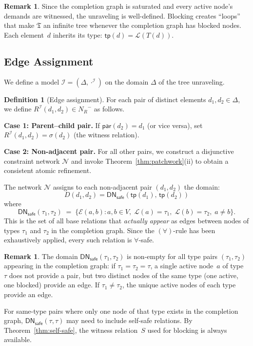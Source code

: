 \documentclass[a4paper,11pt]{article}
\theoremstyle{definition}
\newtheorem{definition}[theorem]{Definition}
\newtheorem{remark}[theorem]{Remark}
\newcommand{\NR}{\ensuremath{N_R}}
\newcommand{\interp}{\ensuremath{\mathcal{I}}}
\newcommand{\DN}{\ensuremath{\mathsf{DN}}}
\begin{document}
\begin{remark}
Since the completion graph is saturated and every active node's
demands are witnessed, the unraveling is well-defined.  Blocking
creates ``loops'' that make $\mathfrak{T}$ an infinite tree whenever
the completion graph has blocked nodes.  Each element~$d$ inherits its
type: $\mathsf{tp}(d) = \mathcal{L}(T(d))$.
\end{remark}

\subsection{Edge Assignment}

We define a model $\interp = (\Delta, \cdot^{\interp})$ on the domain
$\Delta$ of the tree unraveling.

\begin{definition}[Edge assignment]
\label{def:edge-assignment}
For each pair of distinct elements $d_1, d_2 \in \Delta$, we define
$R^{\interp}(d_1, d_2) \in \NR^{-}$ as follows.

\medskip
\noindent\textbf{Case 1: Parent--child pair.}\;
If $\mathsf{par}(d_2) = d_1$ (or vice versa), set $R^{\interp}(d_1,
d_2) = \sigma(d_2)$ (the witness relation).

\medskip
\noindent\textbf{Case 2: Non-adjacent pair.}\;
For all other pairs, we construct a disjunctive constraint network
$\mathcal{N}$ and invoke Theorem~\ref{thm:patchwork}(ii) to obtain a
consistent atomic refinement.

The network $\mathcal{N}$ assigns to each non-adjacent pair $(d_1,
d_2)$ the domain:
\begin{equation}
\label{eq:domain}
  D(d_1, d_2) = \DN_{\mathsf{safe}}(\mathsf{tp}(d_1),\,
    \mathsf{tp}(d_2))
\end{equation}
where
\[
  \DN_{\mathsf{safe}}(\tau_1, \tau_2) \;=\; \bigl\{
    \mathcal{E}(a, b) : a, b \in V,\;
    \mathcal{L}(a) = \tau_1,\; \mathcal{L}(b) = \tau_2,\; a \neq b
  \bigr\}.
\]
This is the set of all base relations that \emph{actually appear} as
edges between nodes of types $\tau_1$ and $\tau_2$ in the completion
graph.  Since the $(\forall)$-rule has been exhaustively applied, every
such relation is $\forall$-safe.
\end{definition}

\begin{remark}
The domain $\DN_{\mathsf{safe}}(\tau_1, \tau_2)$ is non-empty for all
type pairs $(\tau_1, \tau_2)$ appearing in the completion graph: if
$\tau_1 = \tau_2 = \tau$, a single active node~$a$ of type~$\tau$
does not provide a pair, but two distinct nodes of the same type
(one active, one blocked) provide an edge.  If $\tau_1 \neq \tau_2$,
the unique active nodes of each type provide an edge.

For same-type pairs where only one node of that type exists in the
completion graph, $\DN_{\mathsf{safe}}(\tau, \tau)$ may need to
include self-safe relations.  By Theorem~\ref{thm:self-safe}, the
witness relation~$S$ used for blocking is always available.
\end{remark}
\end{document}
